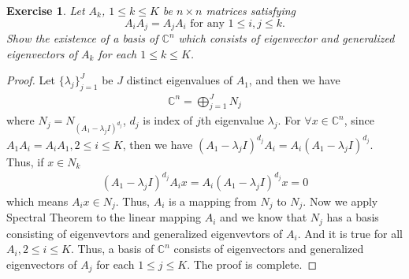 \documentclass[11pt]{book}
\newtheorem{exercise}{Exercise}[section]
\theoremstyle{definition}
\numberwithin{equation}{chapter}
\begin{document}
\begin{exercise}\label{generalized_eigenvectors}
Let $A_{k}$, $1\leq k\leq K$ be $n\times n$ matrices satisfying%
$$
A_{i}A_{j}=A_{j}A_{i}\text{ for any }1\leq i,j\leq k.
$$
Show the existence of a basis of $\mathbb{C}^{n}$ which consists of
eigenvector and generalized eigenvectors of $A_{k}$ for each $1\leq k\leq K$.
\end{exercise}
\begin{proof}
Let $\{\lambda_j\}^J_{j=1}$ be $J$ distinct eigenvalues of $A_1$, and then we have
\begin{align*}
    \mathbb{C}^n = \bigoplus^J_{j=1}N_j
\end{align*}
where $N_j=N_{(A_1-\lambda_j I)^{d_j}}$, $d_j$ is index of $j$th eigenvalue $\lambda_j$. For $\forall x\in\mathbb{C}^n$, since $A_1 A_i=A_i A_1,2\leq i \leq K$, then we have $(A_1-\lambda_j I)^{d_j}A_i=A_i(A_1-\lambda_j I)^{d_j}$. Thus, if $x\in N_k$
\begin{align*}
    (A_1-\lambda_j I)^{d_j}A_ix =A_i(A_1-\lambda_j I)^{d_j}x = 0
\end{align*}
which means $A_i x\in N_j$. Thus, $A_i$ is a mapping from $N_j$ to $N_j$. Now we apply Spectral Theorem to the linear mapping $A_i$ and we know that $N_j$ has a basis consisting of eigenvevtors and generalized eigenvevtors of $A_i$. And it is true for all $A_i, 2\leq i \leq K$. Thus, a basis of $\mathbb{C}^{n}$ consists of
eigenvectors and generalized eigenvectors of $A_{j}$ for each $1\leq j\leq K$. The proof is complete.
\end{proof}

\medskip
\end{document}
